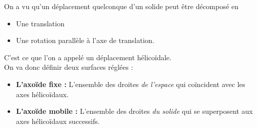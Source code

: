 On a vu qu'un déplacement quelconque d'un solide peut être décomposé en
\begin{itemize}
    \item Une translation
    \item Une rotation parallèle à l'axe de translation.
\end{itemize}
C'est ce que l'on a appelé un déplacement hélicoïdale.\\
On va donc définir deux surfaces réglées : 
\begin{itemize}
    \item \textbf{L'axoïde fixe :} L'ensemble des droites\textit{ de l'espace} qui coïncident avec les axes hélicoïdaux. 
    \item \textbf{L'axoïde mobile :} L'ensemble des droites \textit{du solide} qui se superposent aux axes hélicoïdaux successifs. 
\end{itemize}
